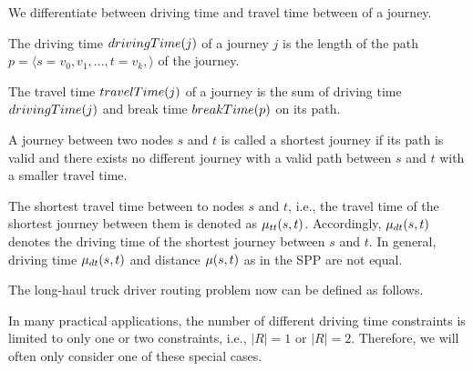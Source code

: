 We differentiate between driving time and travel time between of a journey.

\begin{definition}
	The driving time $drivingTime(j)$ of a journey $j$ is the length of the path $p = \langle s=v_0,v_1,...,t=v_k, \rangle$ of the journey.
\end{definition}

\begin{definition}
	The travel time $travelTime(j)$ of a journey is the sum of driving time $drivingTime(j)$ and break time  $breakTime(p)$ on its path.
\end{definition}

\begin{definition}
	A journey between two nodes $s$ and $t$ is called a shortest journey if its path is valid and there exists no different journey with a valid path between $s$ and $t$ with a smaller travel time.
\end{definition}

The shortest travel time between to nodes $s$ and $t$, i.e., the travel time of the shortest journey between them is denoted as $\mu_{tt}(s,t)$. Accordingly, $\mu_{dt}(s,t)$ denotes the driving time of the shortest journey between $s$ and $t$. In general, driving time $\mu_{dt}(s,t)$ and distance $\mu(s,t)$ as in the SPP are not equal.

The long-haul truck driver routing problem now can be defined as follows.

\begin{namedproblem}
\end{namedproblem}

In many practical applications, the number of different driving time constraints is limited to only one or two constraints, i.e., $|R| = 1$ or  $|R| = 2$. Therefore, we will often only consider one of these special cases.